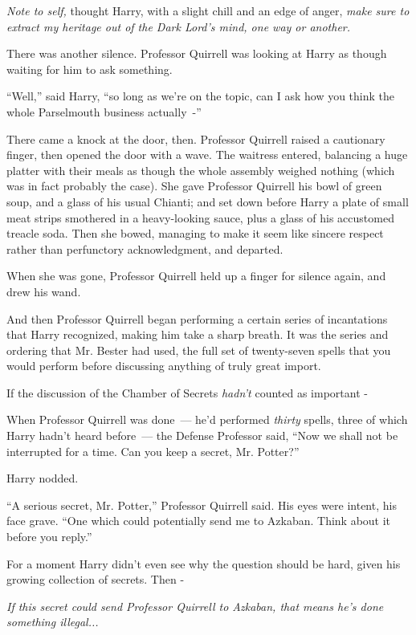\emph{Note to self,} thought Harry, with a slight chill and an edge of anger, \emph{make sure to extract my heritage out of the Dark Lord's mind, one way or another.}

There was another silence. Professor Quirrell was looking at Harry as though waiting for him to ask something.

``Well,'' said Harry, ``so long as we're on the topic, can I ask how you think the whole Parselmouth business actually~-''

There came a knock at the door, then. Professor Quirrell raised a cautionary finger, then opened the door with a wave. The waitress entered, balancing a huge platter with their meals as though the whole assembly weighed nothing (which was in fact probably the case). She gave Professor Quirrell his bowl of green soup, and a glass of his usual Chianti; and set down before Harry a plate of small meat strips smothered in a heavy-looking sauce, plus a glass of his accustomed treacle soda. Then she bowed, managing to make it seem like sincere respect rather than perfunctory acknowledgment, and departed.

When she was gone, Professor Quirrell held up a finger for silence again, and drew his wand.

And then Professor Quirrell began performing a certain series of incantations that Harry recognized, making him take a sharp breath. It was the series and ordering that Mr. Bester had used, the full set of twenty-seven spells that you would perform before discussing anything of truly great import.

If the discussion of the Chamber of Secrets \emph{hadn't} counted as important -

When Professor Quirrell was done~--- he'd performed \emph{thirty} spells, three of which Harry hadn't heard before~--- the Defense Professor said, ``Now we shall not be interrupted for a time. Can you keep a secret, Mr. Potter?''

Harry nodded.

``A serious secret, Mr. Potter,'' Professor Quirrell said. His eyes were intent, his face grave. ``One which could potentially send me to Azkaban. Think about it before you reply.''

For a moment Harry didn't even see why the question should be hard, given his growing collection of secrets. Then -

\emph{If this secret could send Professor Quirrell to Azkaban, that means he's done something illegal...}


